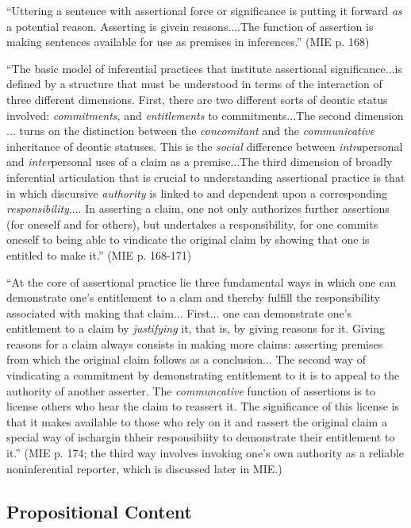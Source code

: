 ``Uttering a sentence with assertional force or significance is
putting it forward \textit{as} a potential reason.  Asserting is
givein reasons....The function of assertion is making sentences
available for use as premises in inferences.'' (MIE p. 168)

``The basic model of inferential practices that institute assertional
significance...is defined by a structure that must be understood in
terms of the interaction of three different dimensions.  First, there
are two different sorts of deontic status involved:
\textit{commitments}, and \textit{entitlements} to commitments...The
second dimension ... turns on the distinction between the
\textit{concomitant} and the \textit{communicative} inheritance of
deontic statuses.  This is the \textit{social} difference between
\textit{intra}personal and \textit{inter}personal uses of a claim as a
premise...The third dimension of broadly inferential articulation
that is crucial to understanding assertional practice is that in which
discursive \textit{authority} is linked to and dependent upon a
corresponding \textit{responsibility}.... In asserting a claim, one
not only authorizes further assertions (for oneself and for others),
but undertakes a responsibility, for one commits oneself to being able
to vindicate the original claim by showing that one is entitled to
make it.'' (MIE p. 168-171)

``At the core of assertional practice lie three fundamental ways in
which one can demonstrate one's entitlement to a clam and thereby
fulfill the responsibility associated with making that
claim... First... one can demonstrate one's entitlement to a claim by
\textit{justifying} it, that is, by giving reasons for it.  Giving
reasons for a claim always consists in making more claims: asserting
premises from which the original claim follows as a conclusion... The
second way of vindicating a commitment by demonstrating entitlement to
it is to appeal to the authority of another asserter.  The
\textit{communcative} function of assertions is to license others who
hear the claim to reassert it.  The significance of this license is
that it makes available to those who rely on it and rassert the
original claim a special way of ischargin thheir responsibiity to
demonstrate their entitlement to it.'' (MIE p. 174; the third way
involves invoking one's own authority as a reliable noninferential
reporter, which is discussed later in MIE.)

\subsection{Propositional Content}
\label{subs:}

